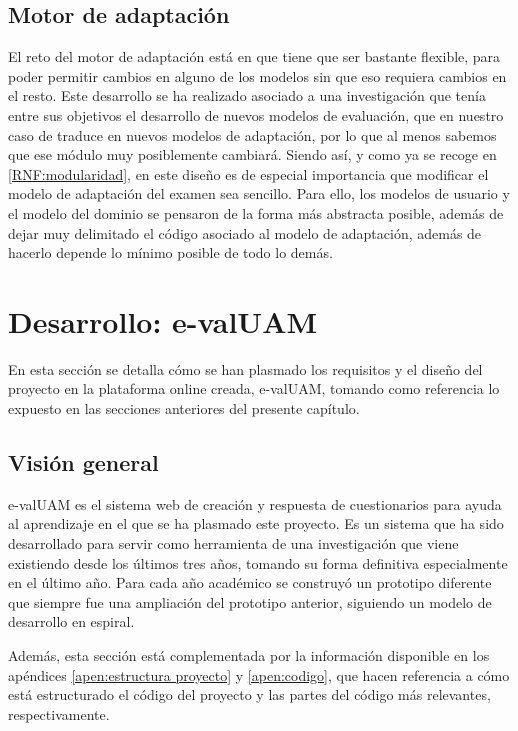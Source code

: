 \subsection{Motor de adaptación}

El reto del motor de adaptación está en que tiene que ser bastante flexible, para poder permitir cambios en alguno de los modelos sin que eso requiera cambios en el resto. Este desarrollo se ha realizado asociado a una investigación que tenía entre sus objetivos el desarrollo de nuevos modelos de evaluación, que en nuestro caso de traduce en nuevos modelos de adaptación, por lo que al menos sabemos que ese módulo muy posiblemente cambiará. Siendo así, y como ya se recoge en \ref{RNF:modularidad}, en este diseño es de especial importancia que modificar el modelo de adaptación del examen sea sencillo. Para ello, los modelos de usuario y el modelo del dominio se pensaron de la forma más abstracta posible, además de dejar muy delimitado el código asociado al modelo de adaptación, además de hacerlo depende lo mínimo posible de todo lo demás.



\section{Desarrollo: e-valUAM\label{sec:desarrollo}}

En esta sección se detalla cómo se han plasmado los requisitos y el diseño del proyecto en la plataforma online creada, \acrshort{e-valUAM}, tomando como referencia lo expuesto en las secciones anteriores del presente capítulo.

\subsection{Visión general}

\acrshort{e-valUAM} es el sistema web de creación y respuesta de cuestionarios para ayuda al aprendizaje en el que se ha plasmado este proyecto. Es un sistema que ha sido desarrollado para servir como herramienta de una investigación que viene existiendo desde los últimos tres años, tomando su forma definitiva especialmente en el último año. Para cada año académico se construyó un prototipo diferente que siempre fue una ampliación del prototipo anterior, siguiendo un modelo de desarrollo en espiral.

Además, esta sección está complementada por la información disponible en los apéndices \ref{apen:estructura proyecto} y \ref{apen:codigo}, que hacen referencia a cómo está estructurado el código del proyecto y las partes del código más relevantes, respectivamente.

